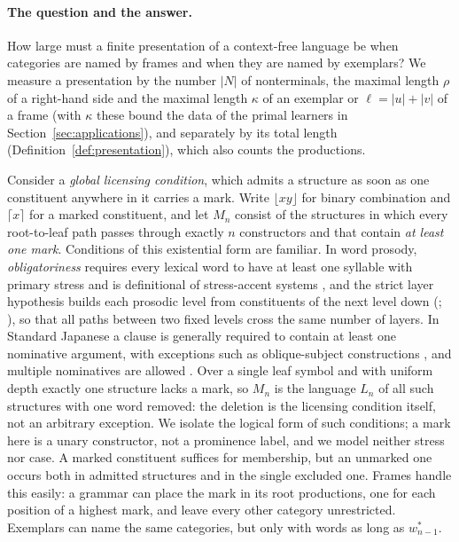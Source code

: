 \documentclass[11pt]{article}
\numberwithin{equation}{section}
\theoremstyle{plain}
\theoremstyle{definition}
\theoremstyle{remark}
\theoremstyle{plain}
\newcommand{\Lfl}{\lfloor}
\newcommand{\Rfl}{\rfloor}
\newcommand{\Lce}{\lceil}
\newcommand{\Rce}{\rceil}
\begin{document}
\paragraph{The question and the answer.}
How large must a finite presentation of a context-free language be when
categories are named by frames and when they are named by exemplars?  We
measure a presentation by the number $|N|$ of nonterminals, the maximal
length $\rho$ of a right-hand side and the maximal length $\kappa$ of an
exemplar or $\ell=|u|+|v|$ of a frame (with $\kappa$ these bound the data
of the primal learners in Section~\ref{sec:applications}), and
separately by its total length (Definition~\ref{def:presentation}), which
also counts the productions.

Consider a \emph{global licensing condition}, which admits a structure as
soon as one constituent anywhere in it carries a mark.  Write $\Lfl xy\Rfl$
for binary combination and $\Lce x\Rce$ for a marked constituent, and let
$M_n$ consist of the structures in which every root-to-leaf path passes
through exactly $n$ constructors and that contain \emph{at least one
mark}.  Conditions of this existential form are familiar.  In word prosody,
\emph{obligatoriness} requires every lexical word to have at least one
syllable with primary stress and is definitional of stress-accent systems
\citep{hyman2006}, and the strict layer hypothesis builds each prosodic
level from constituents of the next level down
(\citealp[p.~26]{selkirk1984}; \citealp[p.~7]{nespor-vogel1986}), so that all paths between two fixed
levels cross the same number of layers.  In Standard Japanese a clause is generally required to contain at
least one nominative argument, with exceptions such as oblique-subject
constructions \citep{kishimoto2010}, and multiple
nominatives are allowed \citep[Ch.~3]{kuno1973}.
Over a single leaf symbol and with uniform depth exactly one structure lacks
a mark, so $M_n$ is the language $L_n$ of all such structures with one word
removed: the deletion is the licensing condition itself, not an arbitrary
exception.  We isolate the logical form of such conditions; a mark here is a
unary constructor, not a prominence label, and we model neither stress nor
case.  A marked constituent suffices for membership, but an unmarked one
occurs both in admitted structures and in the single excluded one.  Frames
handle this easily: a grammar can place the mark in its root productions,
one for each position of a highest mark, and leave every other category
unrestricted.  Exemplars can name the same categories, but only with words
as long as $w^*_{n-1}$.
\end{document}
